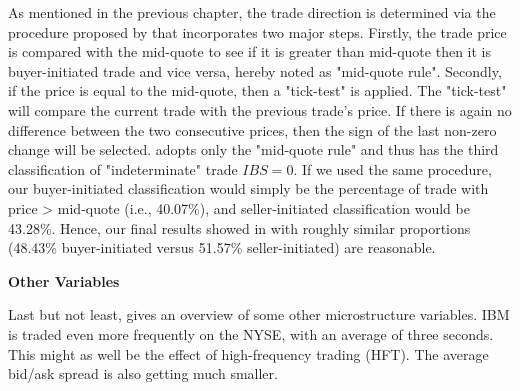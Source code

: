 As mentioned in the previous chapter, the trade direction is determined via the procedure proposed by \citet{leeready1991} that incorporates two major steps. Firstly, the trade price is compared with the mid-quote to see if it is greater than mid-quote then it is buyer-initiated trade and vice versa, hereby noted as "mid-quote rule". Secondly, if the price is equal to the mid-quote, then a "tick-test" is applied. The "tick-test" will compare the current trade with the previous trade's price. If there is again no difference between the two consecutive prices, then the sign of the last non-zero change will be selected. \citet{hausman1992} adopts only the "mid-quote rule" and thus has the third classification of "indeterminate" trade $IBS = 0$. If we used the same procedure, our buyer-initiated classification would simply be the percentage of trade with price > mid-quote (i.e., 40.07\%), and seller-initiated classification would be 43.28\%. Hence, our final results showed in  with roughly similar proportions (48.43\% buyer-initiated versus 51.57\% seller-initiated) are reasonable.

\begin{table}[H]
\centering
{}
\caption{Summary statistics: Trade Direction.}
\label{tab:table-5}
\end{table}

{\noindent\bfseries Other Variables }

Last but not least,  gives an overview of some other microstructure variables. IBM is traded even more frequently on the NYSE, with an average of three seconds. This might as well be the effect of high-frequency trading (HFT). The average bid/ask spread is also getting much smaller.












